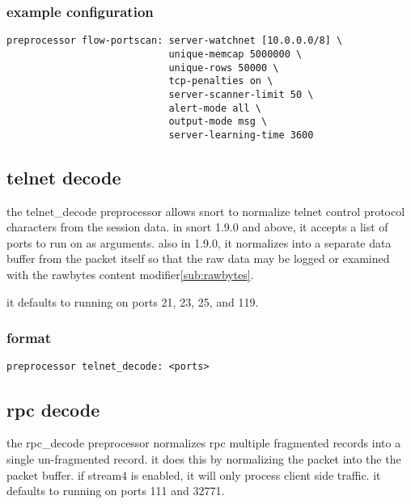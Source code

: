 \documentclass[english]{report}
\begin{document}
\subsubsection{example configuration}

\begin{verbatim}
preprocessor flow-portscan: server-watchnet [10.0.0.0/8] \
                            unique-memcap 5000000 \
                            unique-rows 50000 \
                            tcp-penalties on \
                            server-scanner-limit 50 \
                            alert-mode all \
                            output-mode msg \
                            server-learning-time 3600
\end{verbatim}



\subsection{telnet decode\label{sub:telnet-decode}}

the telnet\_decode preprocessor allows snort to normalize telnet control
protocol characters from the session data. in snort 1.9.0 and above,
it accepts a list of ports to run on as arguments. also in 1.9.0,
it normalizes into a separate data buffer from the packet itself so
that the raw data may be logged or examined with the rawbytes content
modifier\ref{sub:rawbytes}.

it defaults to running on ports 21, 23, 25, and 119.

\subsubsection{format}

\begin{verbatim}
preprocessor telnet_decode: <ports> 
\end{verbatim}

\subsection{rpc decode\label{sub:rpc-decoder}}

the rpc\_decode preprocessor normalizes rpc multiple fragmented
records into a single un-fragmented record.  it does this by
normalizing the packet into the the packet buffer.  if stream4 is
enabled, it will only process client side traffic.  it defaults to
running on ports 111 and 32771.
\end{document}
